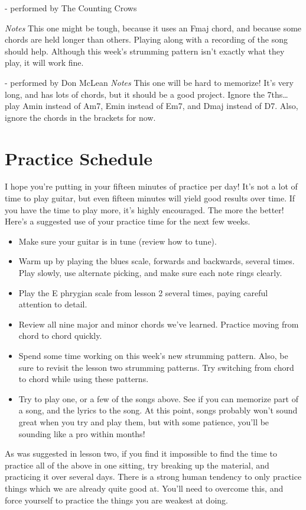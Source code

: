  - performed by The Counting Crows

\emph{Notes} This one might be tough, because it uses an Fmaj chord, and
because some chords are held longer than others. Playing along with a recording
of the song should help. Although this week's strumming pattern isn't exactly
what they play, it will work fine.

 - performed by Don McLean
\emph{Notes} This one will be hard to memorize! It's very long, and has lots of
chords, but it should be a good project. Ignore the 7ths\ldots{} play Amin
instead of Am7, Emin instead of Em7, and Dmaj instead of D7. Also, ignore the
chords in the brackets for now.

\section{Practice Schedule}
I hope you're putting in your fifteen minutes of practice per day! It's not a
lot of time to play guitar, but even fifteen minutes will yield good results
over time. If you have the time to play more, it's highly encouraged. The
more the better! Here's a suggested use of your practice time for the next few
weeks.
%
\begin{itemize}
\item Make sure your guitar is in tune (review how to tune).
\item Warm up by playing the blues scale, forwards and backwards, several
      times. Play slowly, use alternate picking, and make sure each note rings
      clearly.
\item Play the E phrygian scale from lesson 2 several times, paying careful
      attention to detail.
\item Review all nine major and minor chords we've learned. Practice moving
      from chord to chord quickly.
\item Spend some time working on this week's new strumming pattern. Also, be
      sure to revisit the lesson two strumming patterns. Try switching from chord to
      chord while using these patterns.
\item Try to play one, or a few of the songs above. See if you can memorize
      part of a song, and the lyrics to the song. At this point, songs probably won't
      sound great when you try and play them, but with some patience, you'll be
      sounding like a pro within months! 
\end{itemize}
%
As was suggested in lesson two, if you find it impossible to find the time to
practice all of the above in one sitting, try breaking up the material, and
practicing it over several days. There is a strong human tendency to only
practice things which we are already quite good at. You'll need to overcome
this, and force yourself to practice the things you are weakest at doing.

